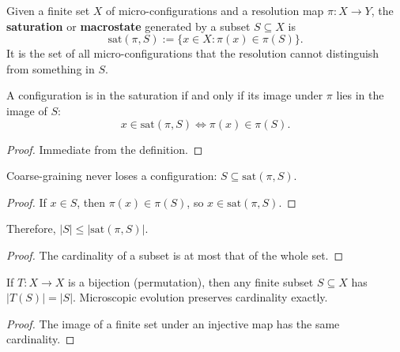 \begin{definition}
Given a finite set $X$ of micro-configurations and a resolution map $\pi : X \to Y$, the \textbf{saturation} or \textbf{macrostate} generated by a subset $S \subseteq X$ is
\begin{equation}
\text{sat}(\pi, S) := \{x \in X : \pi(x) \in \pi(S)\} .
\end{equation}
It is the set of all micro-configurations that the resolution cannot distinguish from something in $S$.
\end{definition}

\begin{theorem}
A configuration is in the saturation if and only if its image under $\pi$ lies in the image of $S$:
\begin{equation}
x \in \text{sat}(\pi, S) \iff \pi(x) \in \pi(S) .
\end{equation}
\end{theorem}

\begin{proof}
Immediate from the definition.
\end{proof}

\begin{theorem}
Coarse-graining never loses a configuration: $S \subseteq \text{sat}(\pi, S)$.
\end{theorem}

\begin{proof}
If $x \in S$, then $\pi(x) \in \pi(S)$, so $x \in \text{sat}(\pi, S)$.
\end{proof}

\begin{theorem}
Therefore, $|S| \leq |\text{sat}(\pi, S)|$.
\end{theorem}

\begin{proof}
The cardinality of a subset is at most that of the whole set.
\end{proof}

\begin{theorem}
If $T : X \to X$ is a bijection (permutation), then any finite subset $S \subseteq X$ has $|T(S)| = |S|$. Microscopic evolution preserves cardinality exactly.
\end{theorem}

\begin{proof}
The image of a finite set under an injective map has the same cardinality.
\end{proof}

